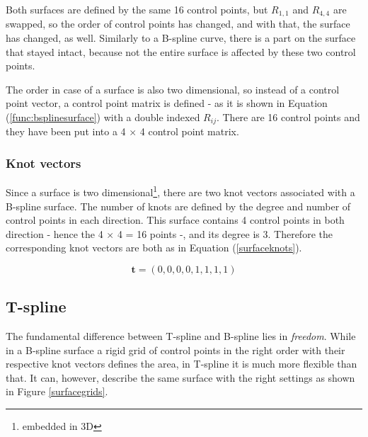 \documentclass{article}
\begin{document}
Both surfaces are defined by the same 16 control points, but $R_{1,1}$ and $R_{4,4}$ are swapped, so the order of control points has changed, and with that, the surface has changed, as well. Similarly to a B-spline curve, there is a part on the surface that stayed intact, because not the entire surface is affected by these two control points.

The order in case of a surface is also two dimensional, so instead of a control point vector, a control point matrix is defined - as it is shown in Equation (\ref{func:bsplinesurface}) with a double indexed $R_{ij}$. There are 16 control points and they have been put into a 4 $\times$ 4 control point matrix.

\subsubsection{Knot vectors}

\vspace{6pt}
Since a surface is two dimensional\footnote{embedded in 3D}, there are two knot vectors associated with a B-spline surface. The number of knots are defined by the degree and number of control points in each direction. This surface contains 4 control points in both direction - hence the 4 $\times$ 4 = 16 points -, and its degree is 3. Therefore the corresponding knot vectors are both as in Equation (\ref{surfaceknots}).

\begin{equation}
\mathbf{t} = (0, 0, 0, 0, 1, 1, 1, 1)
\label{surfaceknots}
\end{equation}

\subsection{T-spline}

\vspace{6pt}

The fundamental difference between T-spline and B-spline lies in \emph{freedom}. While in a B-spline surface a rigid grid of control points in the right order with their respective knot vectors defines the area, in T-spline it is much more flexible than that. It can, however, describe the same surface with the right settings as shown in Figure \ref{surfacegrids}.
\end{document}
